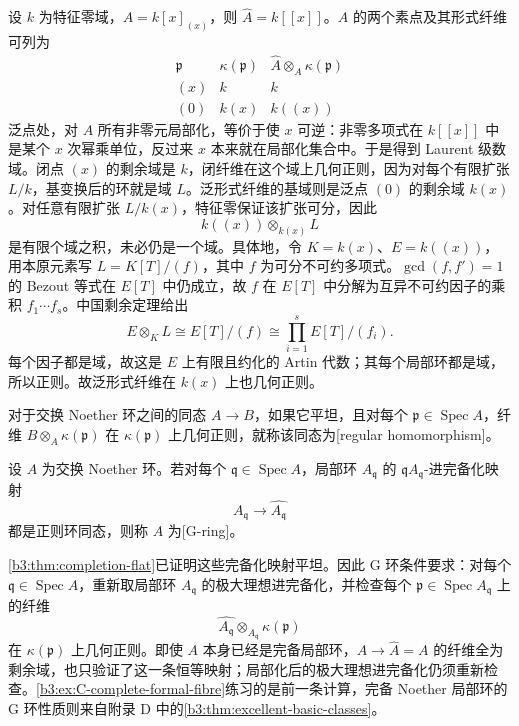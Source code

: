 \begin{example}\label{b3:exm:formal-fibres-line}
	设 \(k\) 为特征零域，\(A=k[x]_{(x)}\)，则 \(\widehat A=k[\![x]\!]\)。\(A\) 的两个素点及其形式纤维可列为
	\[
		\begin{array}{c|c|c}
			\mathfrak p&\kappa(\mathfrak p)&\widehat A\otimes_A\kappa(\mathfrak p)\\
			\hline
			(x)&k&k\\
			(0)&k(x)&k(\!(x)\!)
		\end{array}
	\]
	泛点处，对 \(A\) 所有非零元局部化，等价于使 \(x\) 可逆：非零多项式在 \(k[\![x]\!]\) 中是某个 \(x\) 次幂乘单位，反过来 \(x\) 本来就在局部化集合中。于是得到 Laurent 级数域。闭点 \((x)\) 的剩余域是 \(k\)，闭纤维在这个域上几何正则，因为对每个有限扩张 \(L/k\)，基变换后的环就是域 \(L\)。泛形式纤维的基域则是泛点 \((0)\) 的剩余域 \(k(x)\)。对任意有限扩张 \(L/k(x)\)，特征零保证该扩张可分，因此
	\[
		k(\!(x)\!)\otimes_{k(x)}L
	\]
	是有限个域之积，未必仍是一个域。具体地，令 \(K=k(x)\)、\(E=k(\!(x)\!)\)，用本原元素写 \(L=K[T]/(f)\)，其中 \(f\) 为可分不可约多项式。\(\gcd(f,f')=1\) 的 Bezout 等式在 \(E[T]\) 中仍成立，故 \(f\) 在 \(E[T]\) 中分解为互异不可约因子的乘积 \(f_1\cdots f_s\)。中国剩余定理给出
	\[
		E\otimes_KL\cong E[T]/(f) \cong\prod_{i=1}^s E[T]/(f_i).
	\]
	每个因子都是域，故这是 \(E\) 上有限且约化的 Artin 代数；其每个局部环都是域，所以正则。故泛形式纤维在 \(k(x)\) 上也几何正则。
\end{example}

对于交换 Noether 环之间的同态 \(A\to B\)，如果它平坦，且对每个 \(\mathfrak p\in\operatorname{Spec}A\)，纤维 \(B\otimes_A\kappa(\mathfrak p)\) 在 \(\kappa(\mathfrak p)\) 上几何正则，就称该同态为[regular homomorphism]。

\begin{definition}\label{b3:def:C-g-ring}
	设 \(A\) 为交换 Noether 环。若对每个 \(\mathfrak q\in\operatorname{Spec}A\)，局部环 \(A_{\mathfrak q}\) 的 \(\mathfrak qA_{\mathfrak q}\)-进完备化映射
	\[
		A_{\mathfrak q}\longrightarrow\widehat{A_{\mathfrak q}}
	\]
	都是正则环同态，则称 \(A\) 为[G-ring]。
\end{definition}

\cref{b3:thm:completion-flat}已证明这些完备化映射平坦。因此 G 环条件要求：对每个 \(\mathfrak q\in\operatorname{Spec}A\)，重新取局部环 \(A_{\mathfrak q}\) 的极大理想进完备化，并检查每个 \(\mathfrak p\in\operatorname{Spec}A_{\mathfrak q}\) 上的纤维
\[
	\widehat{A_{\mathfrak q}}\otimes_{A_{\mathfrak q}}\kappa(\mathfrak p)
\]
在 \(\kappa(\mathfrak p)\) 上几何正则。即使 \(A\) 本身已经是完备局部环，\(A\to\widehat A=A\) 的纤维全为剩余域，也只验证了这一条恒等映射；局部化后的极大理想进完备化仍须重新检查。\cref{b3:ex:C-complete-formal-fibre}练习的是前一条计算，完备 Noether 局部环的 G 环性质则来自附录 D 中的\cref{b3:thm:excellent-basic-classes}。


